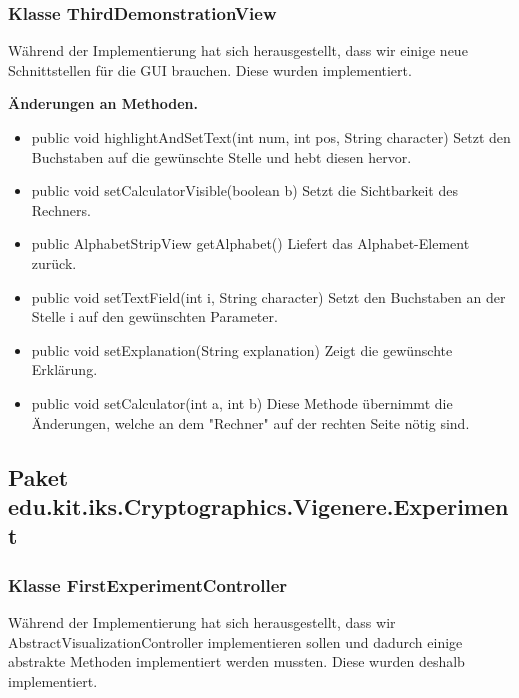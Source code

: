 \documentclass{article}
\begin{document}
    \subsubsection{Klasse ThirdDemonstrationView}
	Während der Implementierung hat sich herausgestellt, dass wir einige neue Schnittstellen für die GUI brauchen. Diese wurden implementiert.\newline
           
    \textbf{Änderungen an Methoden.}
      \begin{itemize}
		\item public void highlightAndSetText(int num, int pos, String character)\newline
              Setzt den Buchstaben auf die gewünschte Stelle und hebt diesen hervor.
		\item public void setCalculatorVisible(boolean b)\newline
              Setzt die Sichtbarkeit des Rechners.
		\item public AlphabetStripView getAlphabet()\newline
              Liefert das Alphabet-Element zurück.
		\item public void setTextField(int i, String character)\newline
              Setzt den Buchstaben an der Stelle i auf den gewünschten Parameter.
		\item public void setExplanation(String explanation)\newline
              Zeigt die gewünschte Erklärung.
		\item public void setCalculator(int a, int b)\newline
              Diese Methode übernimmt die Änderungen, welche an dem "Rechner" auf der rechten Seite nötig sind.
	  \end{itemize}
	  
  \subsection{Paket edu.kit.iks.Cryptographics.Vigenere.Experiment}
    \subsubsection{Klasse FirstExperimentController}
	Während der Implementierung hat sich herausgestellt, dass wir AbstractVisualizationController implementieren sollen und dadurch 
	einige abstrakte Methoden implementiert werden mussten. Diese wurden deshalb implementiert.\newline
           
\end{document}
